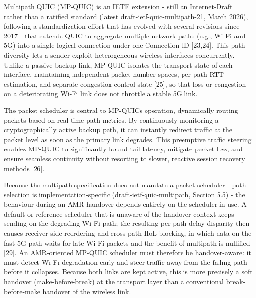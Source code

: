 \documentclass[preprint,11pt]{elsarticle}
\begin{document}
Multipath QUIC (MP-QUIC) is an IETF extension - still an Internet-Draft rather than a ratified standard (latest draft-ietf-quic-multipath-21, March 2026), following a standardization effort that has evolved with several revisions since 2017 - that extends QUIC to aggregate multiple network paths (e.g., Wi-Fi and 5G) into a single logical connection under one Connection ID [23,24]. This path diversity lets a sender exploit heterogeneous wireless interfaces concurrently. Unlike a passive backup link, MP-QUIC isolates the transport state of each interface, maintaining independent packet-number spaces, per-path RTT estimation, and separate congestion-control state [25], so that loss or congestion on a deteriorating Wi-Fi link does not throttle a stable 5G link.

The packet scheduler is central to MP-QUIC\textquotesingle s operation, dynamically routing packets based on real-time path metrics. By continuously monitoring a cryptographically active backup path, it can instantly redirect traffic at the packet level as soon as the primary link degrades. This preemptive traffic steering enables MP-QUIC to significantly bound tail latency, mitigate packet loss, and ensure seamless continuity without resorting to slower, reactive session recovery methods [26].

Because the multipath specification does not mandate a packet scheduler - path selection is implementation-specific (draft-ietf-quic-multipath, Section 5.5) - the behaviour during an AMR handover depends entirely on the scheduler in use. A default or reference scheduler that is unaware of the handover context keeps sending on the degrading Wi-Fi path; the resulting per-path delay disparity then causes receiver-side reordering and cross-path HoL blocking, in which data on the fast 5G path waits for late Wi-Fi packets and the benefit of multipath is nullified [29]. An AMR-oriented MP-QUIC scheduler must therefore be handover-aware: it must detect Wi-Fi degradation early and steer traffic away from the failing path before it collapses. Because both links are kept active, this is more precisely a soft handover (make-before-break) at the transport layer than a conventional break-before-make handover of the wireless link.
\end{document}
